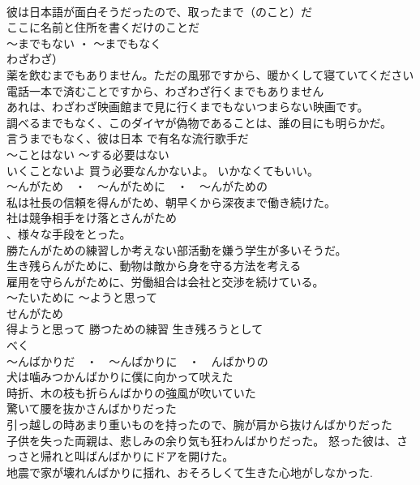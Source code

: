 \documentclass[8pt]{extreport}
\begin{document}
\begin{CJK}{UTF8}{min}
\\	彼は日本語が面白そうだったので、取ったまで（のこと）だ 
\\	ここに名前と住所を書くだけのことだ
\\	～までもない ・ ～までもなく 
\\	わざわざ）	
\\	薬を飲むまでもありません。ただの風邪ですから、暖かくして寝ていてください 
\\	電話一本で済むことですから、わざわざ行くまでもありません 
\\	あれは、わざわざ映画館まで見に行くまでもないつまらない映画です。 
\\	調べるまでもなく、このダイヤが偽物であることは、誰の目にも明らかだ。 
\\	言うまでもなく、彼は日本 で有名な流行歌手だ 
\\	～ことはない ～する必要はない	
\\	いくことないよ 買う必要なんかないよ。 いかなくてもいい。
\\	～んがため　・　～んがために　・　～んがための 
\\	私は社長の信頼を得んがため、朝早くから深夜まで働き続けた。 
\\	社は競争相手をけ落とさんがため
\\	、様々な手段をとった。 
\\	勝たんがための練習しか考えない部活動を嫌う学生が多いそうだ。 
\\	生き残らんがために、動物は敵から身を守る方法を考える 
\\	雇用を守らんがために、労働組合は会社と交渉を続けている。 
\\	～たいために ～ようと思って 
\\	せんがため	
\\	得ようと思って 勝つための練習 生き残ろうとして 
\\	べく
\\	～んばかりだ　・　～んばかりに　・　んばかりの	
\\	犬は噛みつかんばかりに僕に向かって吠えた 
\\	時折、木の枝も折らんばかりの強風が吹いていた 
\\	驚いて腰を抜かさんばかりだった 
\\	引っ越しの時あまり重いものを持ったので、腕が肩から抜けんばかりだった 
\\	子供を失った両親は、悲しみの余り気も狂わんばかりだった。 怒った彼は、さっさと帰れと叫ばんばかりにドアを開けた。
\\	地震で家が壊れんばかりに揺れ、おそろしくて生きた心地がしなかった. 

\end{CJK}
\end{document}
